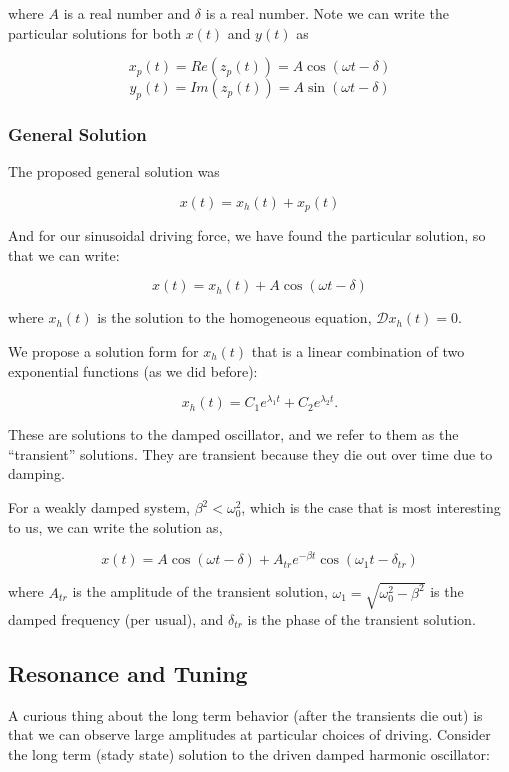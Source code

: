 \documentclass[11pt]{article}
\begin{document}
where \(A\) is a real number and \(\delta\) is a real number. Note we
can write the particular solutions for both \(x(t)\) and \(y(t)\) as

\[x_p(t) = Re\left(z_p(t)\right) = A \cos(\omega t - \delta)\]
\[y_p(t) = Im\left(z_p(t)\right) = A \sin(\omega t - \delta)\]

\subsubsection{General Solution}\label{general-solution}

The proposed general solution was

\[x(t) = x_h(t) + x_p(t)\]

And for our sinusoidal driving force, we have found the particular
solution, so that we can write:

\[x(t) = x_h(t) + A \cos(\omega t - \delta)\]

where \(x_h(t)\) is the solution to the homogeneous equation,
\(\mathcal{D} x_h(t) = 0\).

We propose a solution form for \(x_h(t)\) that is a linear combination
of two exponential functions (as we did before):

\[x_h(t) = C_1 e^{\lambda_1 t} + C_2 e^{\lambda_2 t}.\]

These are solutions to the damped oscillator, and we refer to them as
the ``transient'' solutions. They are transient because they die out
over time due to damping.

For a weakly damped system, \(\beta^2 < \omega_0^2\), which is the case
that is most interesting to us, we can write the solution as,

\[x(t) = A \cos(\omega t - \delta) + A_{tr}e^{-\beta t} \cos(\omega_1 t - \delta_{tr})\]

where \(A_{tr}\) is the amplitude of the transient solution,
\(\omega_1 = \sqrt{\omega_0^2 - \beta^2}\) is the damped frequency (per
usual), and \(\delta_{tr}\) is the phase of the transient solution.

    \subsection{Resonance and Tuning}\label{resonance-and-tuning}

A curious thing about the long term behavior (after the transients die
out) is that we can observe large amplitudes at particular choices of
driving. Consider the long term (stady state) solution to the driven
damped harmonic oscillator:
\end{document}
